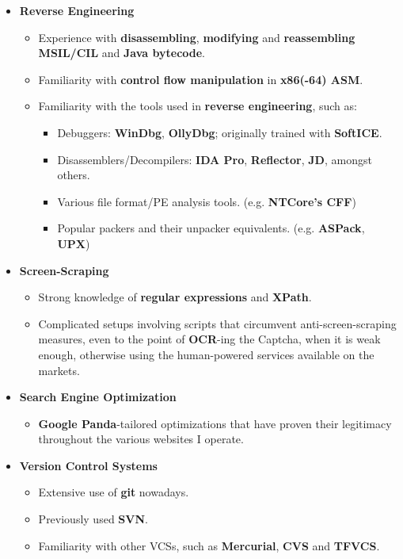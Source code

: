 \documentclass[11pt,a4paper]{article}
\begin{document}
\begin{itemize}
\begin{itemize}
\begin{itemize}
			\end{itemize}
		\item	\textbf{Reverse Engineering}
			\begin{itemize}
			\item	Experience with \textbf{disassembling}, \textbf{modifying} and \textbf{reassembling MSIL/CIL} and \textbf{Java bytecode}.
			\item	Familiarity with \textbf{control flow manipulation} in \textbf{x86(-64) ASM}.
			\item	Familiarity with the tools used in \textbf{reverse engineering}, such as:
				\begin{itemize}
				\item	Debuggers: \textbf{WinDbg}, \textbf{OllyDbg}; originally trained with \textbf{SoftICE}.
				\item	Disassemblers/Decompilers: \textbf{IDA Pro}, \textbf{Reflector}, \textbf{JD}, amongst others.
				\item	Various file format/PE analysis tools. (e.g. \textbf{NTCore's CFF})
				\item	Popular packers and their unpacker equivalents. (e.g. \textbf{ASPack}, \textbf{UPX})
				\end{itemize}
			\end{itemize}
		\item	\textbf{Screen-Scraping}
			\begin{itemize}
			\item	Strong knowledge of \textbf{regular expressions} and \textbf{XPath}.
			\item	Complicated setups involving scripts that circumvent anti-screen-scraping measures, even to the point of \textbf{OCR}-ing the Captcha, when it is weak enough, otherwise using the human-powered services available on the markets.
			\end{itemize}
		\item	\textbf{Search Engine Optimization}
			\begin{itemize}
			\item	\textbf{Google Panda}-tailored optimizations that have proven their legitimacy throughout the various websites I operate.
			\end{itemize}
		\item	\textbf{Version Control Systems}
			\begin{itemize}
			\item	Extensive use of \textbf{git} nowadays.
			\item	Previously used \textbf{SVN}.
			\item	Familiarity with other VCSs, such as \textbf{Mercurial}, \textbf{CVS} and \textbf{TFVCS}.

\end{itemize}
\end{itemize}
\end{itemize}
\end{document}
